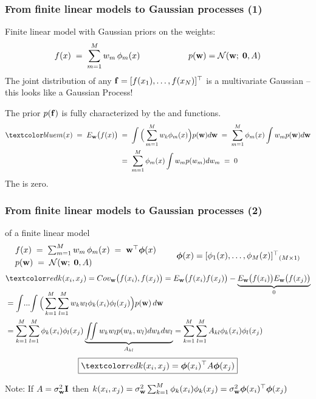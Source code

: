 \begin{frame}
\frametitle{From finite linear models to Gaussian processes (1)}
Finite linear model with Gaussian priors on the weights:
%
\[
f(x)\;=\;\sum_{m=1}^M w_m\,\phi_m(x) {\hspace{2cm}} 
p(\mathbf w)=\mathcal{N}(\mathbf w;\; \mathbf{0}, A)
\]
%
The joint distribution of any $\mathbf f=[f(x_1),\ldots,f(x_N)]^\top$ is a
multivariate Gaussian -- this looks like a Gaussian Process!

The prior $p(\mathbf f)$ is fully characterized by the  and  
functions.
%
\begin{align*}
\Blue{m(x)\;=\;E_\bfw\big(f(x)\big)}
&\;=\;\int\Big(\sum_{m=1}^M w_k\phi_m(x)\Big) p(\bfw) d\bfw
\;=\;\sum_{m=1}^M \phi_m(x)\int w_m p(\bfw) d \bfw\\
&\;=\;\sum_{m=1}^M \phi_m(x)\int w_m p(w_m) dw_m\;=\;0
\end{align*}
The  is zero.
 
\end{frame}


\begin{frame}
\frametitle{From finite linear models to Gaussian processes (2)}

 of a finite linear model
%
\[
\begin{array}{l}
f(x)\;=\;\sum_{m=1}^M w_m\,\phi_m(x)\;=\;\mathbf w^\top\boldsymbol{\phi}(x)\\[1mm]
p(\mathbf w)\;=\;\mathcal{N}(\mathbf w;\; \mathbf{0}, A)
\end{array}
{\; \; \; \; \; }
\begin{array}{lr}
\boldsymbol{\phi}(x) = [\phi_1(x),\ldots,\phi_M(x)]^\top \!\!\! & \!\!\! _{(M \times 1)}
\end{array}
\]
%
%
\begin{align*}
&\Red{k(x_i, x_j)=Cov_\bfw \big(f(x_i), f(x_j)\big)}=E_\bfw\big(f(x_i)f(x_j)\big)
 -\underbrace{E_\bfw\big(f(x_i)\big)E_\bfw\big(f(x_j)\big)}_{0}\\[-3mm]
&=\int\!...\!\int\Big(\sum_{k=1}^M\sum_{l=1}^M w_kw_l\phi_k(x_i)\phi_l(x_j)\Big)
 p(\bfw)\,d\bfw\\
&=\sum_{k=1}^M\sum_{l=1}^M \phi_k(x_i)\phi_l(x_j) 
\underbrace{\iint w_kw_l p(w_k, w_l) dw_kdw_l}_{A_{kl}}
= \sum_{k=1}^M\sum_{l=1}^M A_{kl}\phi_k(x_i)\phi_l(x_j)
\end{align*}
%
\[
\boxed{\Red{k(x_i,x_j)}=\bphi(x_i)^\top A \bphi(x_j)}
\]
%

Note: If $A=\sigma_\mathbf w^2 \mathbf I$ then 
$k(x_i,x_j)=\sigma_\mathbf w^2 \sum_{k=1}^M \phi_k(x_i)\phi_k(x_j)=\sigma_\mathbf w^2\boldsymbol{\phi}(x_i)^\top\boldsymbol{\phi}(x_j)$

\end{frame}


